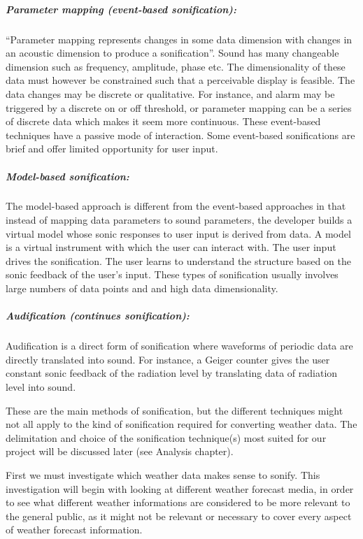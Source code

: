 \subparagraph{Parameter mapping (event-based sonification):} %
\label{subp:parameter_mapping_event_based_sonification_}
\enquote{Parameter mapping represents changes in some data dimension with changes in an acoustic dimension to produce a sonification}. 
Sound has many changeable dimension such as frequency, amplitude, phase etc.
The dimensionality of these data must however be constrained such that a perceivable display is feasible. 
The data changes may be discrete or qualitative. 
For instance, and alarm may be triggered by a discrete on or off threshold, or parameter mapping can be a series of discrete data which makes it seem more continuous. 
These event-based techniques have a passive mode of interaction. 
Some event-based sonifications are brief and offer limited opportunity for user input.

\subparagraph{Model-based sonification:} %
\label{subp:model_based_sonification_}
The model-based approach is different from the event-based approaches in that instead of mapping data parameters to sound parameters, the developer builds a virtual model whose sonic responses to user input is derived from data. 
A model is a virtual instrument with which the user can interact with. 
The user input drives the sonification. 
The user learns to understand the structure based on the sonic feedback of the user’s input.
These types of sonification usually involves large numbers of data points and and high data dimensionality.

\subparagraph{Audification (continues sonification):} %
\label{subp:audification_continues_sonification_}
Audification is a direct form of sonification where waveforms of periodic data are directly translated into sound. For instance, a Geiger counter gives the user constant sonic feedback of the radiation level by translating data of radiation level into sound.

These are the main methods of sonification, but the different techniques might not all apply to the kind of sonification required for converting weather data. 
The delimitation and choice of the sonification technique(s) most suited for our project will be discussed later (see Analysis chapter).

First we must investigate which weather data makes sense to sonify. 
This investigation will begin with looking at different weather forecast media, in order to see what different weather informations are considered to be more relevant to the general public, as it might not be relevant or necessary to cover every aspect of weather forecast information. 

